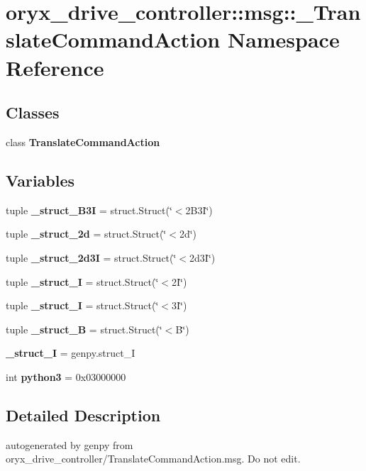 \section{oryx\-\_\-drive\-\_\-controller\-:\-:msg\-:\-:\-\_\-\-Translate\-Command\-Action \-Namespace \-Reference}
\label{namespaceoryx__drive__controller_1_1msg_1_1__TranslateCommandAction}
\subsection*{\-Classes}
\begin{DoxyCompactItemize}
\item 
class {\bf \-Translate\-Command\-Action}
\end{DoxyCompactItemize}
\subsection*{\-Variables}
\begin{DoxyCompactItemize}
\item 
tuple {\bf \-\_\-struct\-\_\-B3\-I} = struct.\-Struct(\char`\"{}$<$2\-B3\-I\char`\"{})
\item 
tuple {\bf \-\_\-struct\-\_\-2d} = struct.\-Struct(\char`\"{}$<$2d\char`\"{})
\item 
tuple {\bf \-\_\-struct\-\_\-2d3\-I} = struct.\-Struct(\char`\"{}$<$2d3\-I\char`\"{})
\item 
tuple {\bf \-\_\-struct\-\_\-I} = struct.\-Struct(\char`\"{}$<$2\-I\char`\"{})
\item 
tuple {\bf \-\_\-struct\-\_\-I} = struct.\-Struct(\char`\"{}$<$3\-I\char`\"{})
\item 
tuple {\bf \-\_\-struct\-\_\-\-B} = struct.\-Struct(\char`\"{}$<$\-B\char`\"{})
\item 
{\bf \-\_\-struct\-\_\-\-I} = genpy.\-struct\-\_\-\-I
\item 
int {\bf python3} = 0x03000000
\end{DoxyCompactItemize}


\subsection{\-Detailed \-Description}
\begin{DoxyVerb}autogenerated by genpy from oryx_drive_controller/TranslateCommandAction.msg. Do not edit.\end{DoxyVerb}
 

